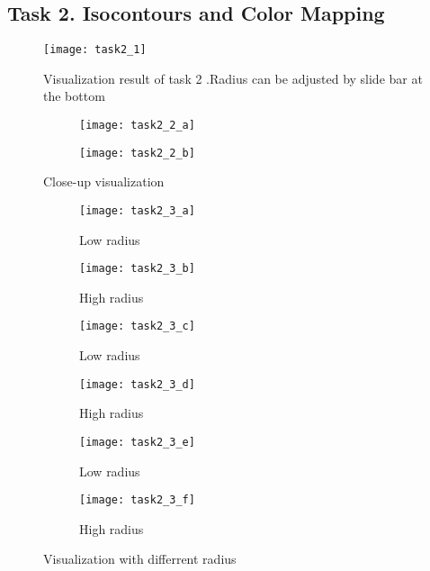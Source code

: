 \documentclass[11pt]{article}
\begin{document}
\subsection*{Task 2. Isocontours and Color Mapping}

\begin{figure}[H]
\centering
\texttt{[image: task2\_1]}
\caption{Visualization result of task 2 .Radius can be adjusted by slide bar at the bottom}
\label{fig: task2_1}
\end{figure}

\begin{figure}[H]
\begin{subfigure}{1\textwidth}
  \centering
  \texttt{[image: task2\_2\_a]}
  \caption{}
  \label{fig:task2_2_a}
\end{subfigure}
\begin{subfigure}{1\textwidth}
  \centering
  \texttt{[image: task2\_2\_b]}
  \caption{}
  \label{fig:task2_2_b}
\end{subfigure}

\caption{Close-up visualization}
\label{fig:task2_2}
\end{figure}


\begin{figure}[H]
\begin{subfigure}{.5\textwidth}
  \centering
  \texttt{[image: task2\_3\_a]}
  \caption{Low radius}
  \label{fig:task2_3_a}
\end{subfigure}
\begin{subfigure}{.5\textwidth}
  \centering
  \texttt{[image: task2\_3\_b]}
  \caption{High radius}
  \label{fig:task2_3_b}
\end{subfigure}

\begin{subfigure}{.5\textwidth}
  \centering
  \texttt{[image: task2\_3\_c]} 
  \caption{Low radius}
  \label{fig:task2_3_c}
\end{subfigure}
\begin{subfigure}{.5\textwidth}
  \centering
  \texttt{[image: task2\_3\_d]}
  \caption{High radius}
  \label{fig:task2_3_d}
\end{subfigure}

\begin{subfigure}{.5\textwidth}
  \centering
  \texttt{[image: task2\_3\_e]} 
  \caption{Low radius}
  \label{fig:task2_3_e}
\end{subfigure}
\begin{subfigure}{.5\textwidth}
  \centering
  \texttt{[image: task2\_3\_f]}
  \caption{High radius}
  \label{fig:task2_3_f}
\end{subfigure}
\caption{Visualization with differrent radius}
\label{fig:task2_3}
\end{figure}
\end{document}
